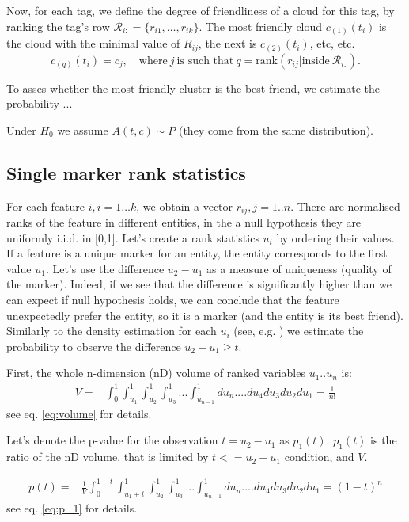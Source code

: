 \documentclass{llncs}
\begin{document}
Now, for each tag, we define the degree of friendliness of a cloud for this tag, by ranking the tag's row $\mathcal{R}_{i:}= \{r_{i1}, \dots, r_{ik}\}$. The most friendly cloud $c_{(1)}(t_i)$ is the cloud with the minimal value of $R_{ij}$, the next is $c_{(2)}(t_i)$, etc, etc. 
\[
c_{(q)}(t_i) = c_{j}, \quad \text{where}~j~\text{is such that}~ q = \text{rank}(r_{ij}|\text{inside}~\mathcal{R}_{i:}).
\]



To asses whether the most friendly cluster is the best friend, we estimate the probability ...

Under $H_0$ we assume $A(t, c) \sim P$ (they come from the same distribution).


 

\subsection{Single marker rank statistics}
For each feature $i,i=1\dots k$, we obtain a vector $r_{ij}, j=1..n$. There are normalised ranks of the feature in different entities, in the a null hypothesis they are uniformly i.i.d. in [0,1]. Let's create a rank statistics $u_i$ by ordering their values. If a feature is a unique marker for an entity, the entity corresponds to the first  value $u_1$. Let's use the difference $u_2-u_1$ as a measure of uniqueness (quality of the marker). Indeed, if we see that the difference is significantly higher than we can expect if null hypothesis holds, we can conclude that the feature unexpectedly prefer the entity, so it is a marker (and the entity is its best friend). Similarly to the density estimation for each $u_i$ (see, e.g. \cite{Gut:2009}) we estimate the probability to observe the difference $u_2 - u_1 \ge t$. 

First, the whole n-dimension (nD) volume of ranked variables $u_1 .. u_n$ is:
\begin{eqnarray*}
V = &\displaystyle \int_0^1\int_{u_1}^1\int_{u_2}^1\int_{u_3}^1...\int_{u_{n-1}}^1 du_n....du_4 du_3 du_2 du_1 =  \frac{1}{n!}
\end{eqnarray*}
see eq. \ref{eq:volume} for details.

Let's denote the p-value for the observation $t=u_2-u_1$ as $p_1(t)$. $p_1(t)$ is the ratio of the nD volume, that is limited by $t<=u_2-u_1$ condition, and $V$.

\begin{eqnarray*}
p(t) = & \displaystyle\frac{1}{V} \displaystyle \int_0^{1-t}\int_{{u_1}+t}^1\int_{u_2}^1\int_{u_3}^1...\int_{u_{n-1}}^1 du_n....du_4 du_3 du_2 du_1 = (1-t)^n
\end{eqnarray*}
see eq. \ref{eq:p_1} for details.
\end{document}
